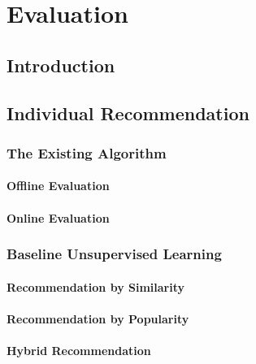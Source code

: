 
\chapter{Evaluation}\label{chapter:evaluation}

\section{Introduction}

\section{Individual Recommendation}

\subsection{The Existing Algorithm}

\subsubsection{Offline Evaluation}

\subsubsection{Online Evaluation}

\subsection{Baseline Unsupervised Learning}

\subsubsection{Recommendation by Similarity}

\subsubsection{Recommendation by Popularity}\label{subsubsection:eval-popularity}

\subsubsection{Hybrid Recommendation}\label{subsubsection:eval-hybrid}


